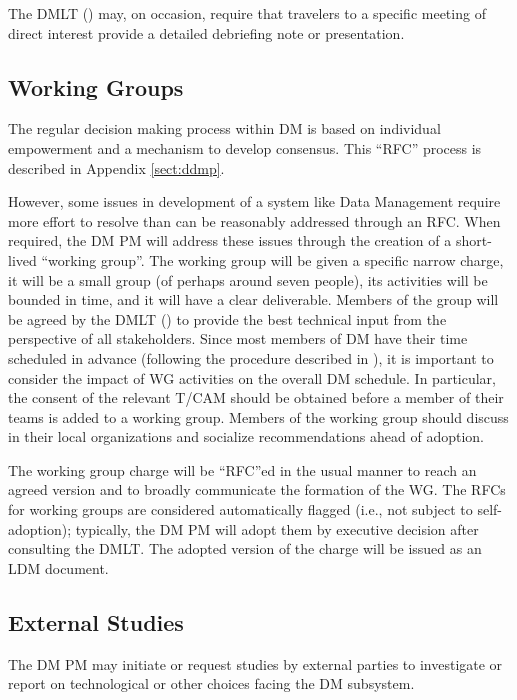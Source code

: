 The \gls{DMLT} () may, on occasion, require that travelers to a specific meeting of direct interest provide a detailed debriefing note or presentation.

\subsection {Working Groups} \label{sect:wgs}

The regular decision making process within \gls{DM} is based on individual empowerment and a mechanism to develop consensus.
This ``RFC'' process is described in Appendix \ref{sect:ddmp}.

However, some issues in development of a system like \gls{Data Management} require more effort to resolve than can be reasonably addressed through an \gls{RFC}.
When required, the \gls{DM} \gls{PM} will address these issues through the creation of a short-lived ``working group''.
The working group will be given a specific narrow charge, it will be a small group (of perhaps around seven people), its activities will be bounded in time, and it will have a clear deliverable.
Members of the group will be agreed by the \gls{DMLT} () to provide the best technical input from the perspective of all stakeholders.
Since most members of \gls{DM} have their time scheduled in advance (following the procedure described in ), it is important to consider the impact of \gls{WG} activities on the overall \gls{DM} schedule.
In particular, the consent of the relevant \gls{T/CAM} should be obtained before a member of their teams is added to a working group.
Members of the working group should discuss in their local organizations and socialize recommendations ahead of adoption.

The working group charge will be ``RFC''ed in the usual manner to reach an agreed version and to broadly communicate the formation of the \gls{WG}.
The RFCs for working groups are considered automatically flagged (i.e., not
subject to self-adoption); typically, the \gls{DM} \gls{PM} will adopt them by executive
decision after consulting the \gls{DMLT}.  The adopted version of the charge will be issued as an \gls{LDM} document.

\subsection {External Studies} \label{sect:studies}

The \gls{DM} \gls{PM} may initiate or request studies by external parties to investigate or report on technological or other choices facing the \gls{DM} subsystem.


